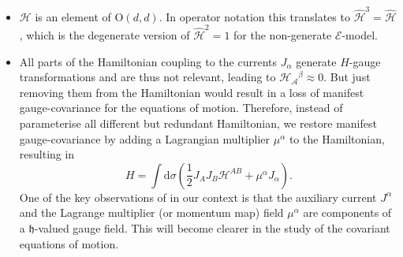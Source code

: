 \documentclass[11pt,a4paper]{article}
\numberwithin{equation}{section}
\begin{document}
\begin{itemize}
	\item $\mathcal{H}$ is an element of O$(d,d)$. In operator notation this translates to $\mathcal{\hat{H}}^3 = \mathcal{\hat{H}}$, which is the degenerate version of $\mathcal{\hat{H}}^2 = 1$ for the non-generate $\mathcal{E}$-model.
	
		\item 
	All parts of the Hamiltonian coupling to the currents $J_\alpha$ generate $H$-gauge transformations and are thus not relevant, leading to ${\mathcal{H}_\mathcal{A}}{}^\beta \approx 0$. But just removing them from the Hamiltonian would result in a loss of manifest gauge-covariance for the equations of motion. Therefore, instead of parameterise all different but redundant Hamiltonian, we restore manifest gauge-covariance by adding a Lagrangian multiplier $\mu^\alpha$ to the Hamiltonian, resulting in
	\begin{equation}
		H = \int \mathrm{d}\sigma \left( \frac{1}{2}	J_A J_B \mathcal{H}^{AB} + \mu^\alpha J_\alpha \right). \label{eq:HamiltonianMultiplier}
\end{equation}
One of the key observations of\cite{Lacroix:2023ybi} in our context is that the auxiliary current $J^\alpha$ and the Lagrange multiplier (or momentum map) field $\mu^\alpha$ are components of a $\mathfrak{h}$-valued gauge field. This will become clearer in the study of the covariant equations of motion.
\end{itemize}
\end{document}
